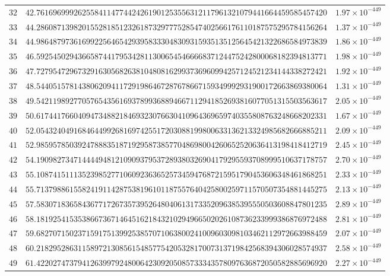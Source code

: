 \documentclass[12pt,reqno]{amsart}
\theoremstyle{remark}
\begin{document}
\begin{longtable}{clc}
$32$ & $42.7616969992625584114774424261901253556312117961321079441664459585457420$ & $1.97\times 10^{-449}$ \\
$33$ & $44.2860871398201552818512326187329777528547402566176110187575295784156264$ & $1.37\times 10^{-449}$ \\
$34$ & $44.9864879736169922564654293958333048309315935135125645421322686584973839$ & $1.86\times 10^{-449}$ \\
$35$ & $46.5925450294366587441795342811300654546666837124475242800068182394813771$ & $1.98\times 10^{-449}$ \\
$36$ & $47.7279547296732916305682638104808162993736960994257124521234144338272421$ & $1.92\times 10^{-449}$ \\
$37$ & $48.5440515781438062094117291986467287678667159349992931900172663869380064$ & $1.31\times 10^{-449}$ \\
$38$ & $49.5421198927705765435616937899368894667112941852693816077051315503563617$ & $2.05\times 10^{-449}$ \\
$39$ & $50.6174417660409473488218469323076630410964369659740355808763248668202331$ & $1.67\times 10^{-449}$ \\
$40$ & $52.0543240491684644992681697425517203088199800633136213324985682666885211$ & $2.09\times 10^{-449}$ \\
$41$ & $52.9859578503924788835187192958738577048698004260652520636413198418412719$ & $2.45\times 10^{-449}$ \\
$42$ & $54.1909827347144449481210909379537289380326904179295593708999510637178757$ & $2.70\times 10^{-449}$ \\
$43$ & $55.1087415111352398527710609236365257345947687215951790453606348461868251$ & $2.33\times 10^{-449}$ \\
$44$ & $55.7137988615582419114287538196101187557640425800259711570507354881445275$ & $2.13\times 10^{-449}$ \\
$45$ & $57.5830718365843677172673573952648040613173352096385395550503608847801235$ & $2.89\times 10^{-449}$ \\
$46$ & $58.1819254153538667367146451621843210294966502026108736233999386876972488$ & $2.81\times 10^{-449}$ \\
$47$ & $59.6827071502371591751399253857071063800241009603098103462112972663988459$ & $2.07\times 10^{-449}$ \\
$48$ & $60.2182952863115897213085615485775420532817007313719842568394306028574937$ & $2.58\times 10^{-449}$ \\
$49$ & $61.4220274737941263997924800642309205085733343578097636872050582885696920$ & $2.27\times 10^{-449}$ \\

\end{longtable}
\end{document}
